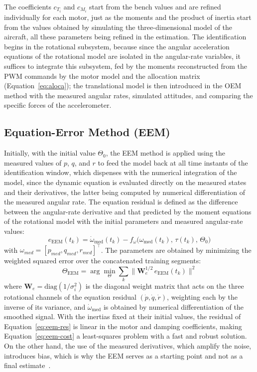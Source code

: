 \documentclass{ieeeaccess}
\begin{document}
The coefficients $c_{T_i}$ and $c_{M_i}$ start from the bench values and are refined individually for each motor, just as the moments and the product of inertia start from the values obtained by simulating the three-dimensional model of the aircraft, all these parameters being refined in the estimation. The identification begins in the rotational subsystem, because since the angular acceleration equations of the rotational model are isolated in the angular-rate variables, it suffices to integrate this subsystem, fed by the moments reconstructed from the PWM commands by the motor model and the allocation matrix (Equation~\eqref{eq:aloca}); the translational model is then introduced in the OEM method with the measured angular rates, simulated attitudes, and comparing the specific forces of the accelerometer.

\subsection{Equation-Error Method (EEM)}

Initially, with the initial value $\Theta_0$, the EEM method is applied using the measured values of $p$, $q$, and $r$ to feed the model back at all time instants of the identification window, which dispenses with the numerical integration of the model, since the dynamic equation is evaluated directly on the measured states and their derivatives, the latter being computed by numerical differentiation of the measured angular rate. The equation residual is defined as the difference between the angular-rate derivative and that predicted by the moment equations of the rotational model with the initial parameters and measured angular-rate values:
\begin{equation}
e_{\text{EEM}}(t_k) = \dot{\omega}_{\text{med}}(t_k) - f_\omega\big(\omega_{\text{med}}(t_k),\, \tau(t_k),\, \Theta_0\big)
\label{eq:eem-res}
\end{equation}
with $\omega_{med} = [p_{med}, q_{med}, r_{med}]^{\top}$. The parameters are obtained by minimizing the weighted squared error over the concatenated training segments:
\begin{equation}
\Theta_{\text{EEM}} = \arg\min_{\Theta} \sum_{k} \big\| \mathbf{W}_e^{1/2}\, e_{\text{EEM}}(t_k) \big\|^2
\label{eq:eem-cost}
\end{equation}
where $\mathbf{W}_e = \mathrm{diag}(1/\sigma_i^2)$ is the diagonal weight matrix that acts on the three rotational channels of the equation residual $(\dot{p},\dot{q},\dot{r})$, weighting each by the inverse of its variance, and $\dot{\omega}_{\text{med}}$ is obtained by numerical differentiation of the smoothed signal. With the inertias fixed at their initial values, the residual of Equation~\eqref{eq:eem-res} is linear in the motor and damping coefficients, making Equation~\eqref{eq:eem-cost} a least-squares problem with a fast and robust solution. On the other hand, the use of the measured derivatives, which amplify the noise, introduces bias, which is why the EEM serves as a starting point and not as a final estimate~\cite{c2}.
\end{document}
